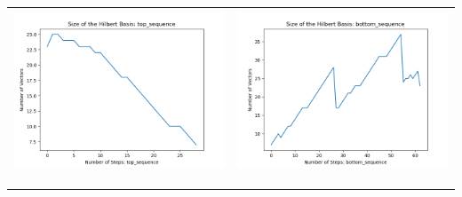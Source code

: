 \documentclass[10pt]{article}
\begin{document}
\begin{tabular}{c|c}
\begin{minipage}{.4\textwidth}
\includegraphics[width=\textwidth]{"DATA/4d/5 generators 2 bound F/top_sequence SIZE"}
\end{minipage} &
\begin{minipage}{.4\textwidth}
\includegraphics[width=\textwidth]{"DATA/4d/5 generators 2 bound F bottomup/bottom_sequence SIZE"}
\end{minipage} \\ \\
\hline \\\begin{minipage}{.4\textwidth}

\end{minipage}
\end{tabular}
\end{document}
